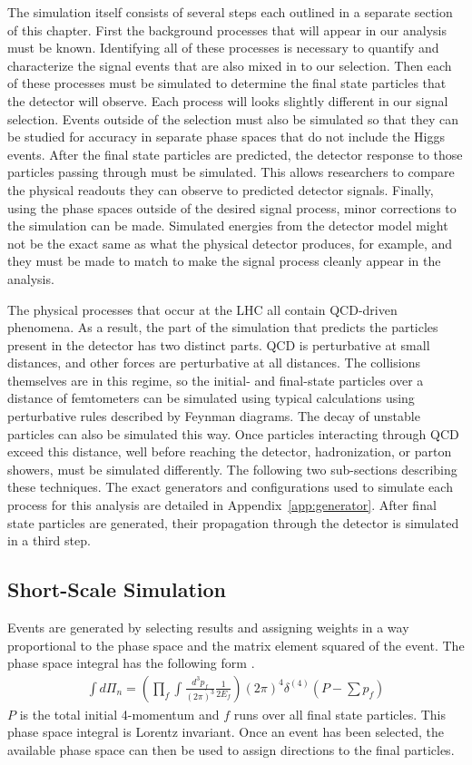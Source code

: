 The simulation itself consists of several steps
each outlined in a separate section of this chapter.
First the background processes that will appear in our analysis must be known.
Identifying all of these processes is necessary to quantify and characterize
the signal events that are also mixed in to our selection.
Then each of these processes must be simulated to determine the final state particles
that the detector will observe.
Each process will looks slightly different in our signal selection.
Events outside of the selection must also be simulated so that they can be studied
for accuracy in separate phase spaces that do not include the Higgs events.
After the final state particles are predicted,
the detector response to those particles passing through must be simulated.
This allows researchers to compare the physical readouts
they can observe to predicted detector signals.
Finally, using the phase spaces outside of the desired signal process,
minor corrections to the simulation can be made.
Simulated energies from the detector model might not be the exact same as
what the physical detector produces, for example,
and they must be made to match to make the signal process cleanly appear in the analysis.

The physical processes that occur at the LHC all contain QCD-driven phenomena.
As a result, the part of the simulation that predicts the particles present in the detector
has two distinct parts.
QCD is perturbative at small distances,
and other forces are perturbative at all distances.
The collisions themselves are in this regime,
so the initial- and final-state particles over a distance of femtometers
can be simulated using typical calculations using
perturbative rules described by Feynman diagrams.
The decay of unstable particles can also be simulated this way.
Once particles interacting through QCD exceed this distance,
well before reaching the detector,
hadronization, or parton showers, must be simulated differently.
The following two sub-sections describing these techniques.
The exact generators and configurations used to simulate each process for this analysis
are detailed in Appendix~\ref{app:generator}.
After final state particles are generated,
their propagation through the detector is simulated in a third step.

\subsection{Short-Scale Simulation}

Events are generated by selecting results and assigning weights in a way proportional
to the phase space and the matrix element squared of the event.
The phase space integral has the following form \cite{Peskin:257493}.
\begin{gather}
  \int d\Pi_n = \left( \prod_f \int \frac{d^3p_f}{(2\pi)^3} \frac{1}{2E_f} \right)
                (2\pi)^4 \delta^{(4)}(P - \sum p_f)
\end{gather}
$P$ is the total initial 4-momentum and $f$ runs over all final state particles.
This phase space integral is Lorentz invariant.
Once an event has been selected, the available phase space can then be used to assign
directions to the final particles.

